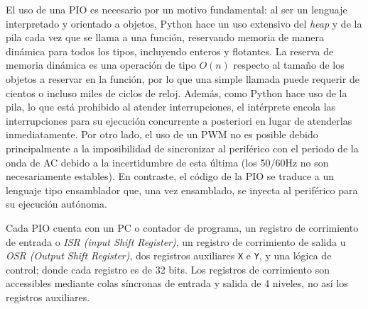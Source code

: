 El uso de una PIO es necesario por un motivo fundamental:
al ser un lenguaje interpretado y orientado a objetos, Python hace un uso extensivo del \emph{heap} y de la pila cada vez que se llama a una función, reservando memoria de manera dinámica para todos los tipos, incluyendo enteros y flotantes.
La reserva de memoria dinámica es una operación de tipo \(O(n)\) respecto al tamaño de los objetos a reservar en la función, por lo que una simple llamada puede requerir de cientos o incluso miles de ciclos de reloj.
Además, como Python hace uso de la pila,\footnotemark{} lo que está prohibido al atender interrupciones, el intérprete encola las interrupciones para su ejecución concurrente a posteriori en lugar de atenderlas inmediatamente.
Por otro lado, el uso de un PWM no es posible debido principalmente a la imposibilidad de sincronizar al periférico con el periodo de la onda de AC debido a la incertidumbre de esta última (los 50/60Hz no son necesariamente estables).
En contraste, el código de la PIO se traduce a un lenguaje tipo ensamblador que, una vez ensamblado, se inyecta al periférico para su ejecución autónoma.

Cada PIO cuenta con
	un PC o contador de programa,
	un registro de corrimiento de entrada o \emph{ISR (input Shift Register)},
	un registro de corrimiento de salida u \emph{OSR (Output Shift Register)},
	dos registros auxiliares \texttt{X} e \texttt{Y},
	y una lógica de control;
donde cada registro es de 32 bits.
Los registros de corrimiento son accessibles mediante colas síncronas de entrada y salida de 4 niveles, no así los registros auxiliares.

\clearpage

